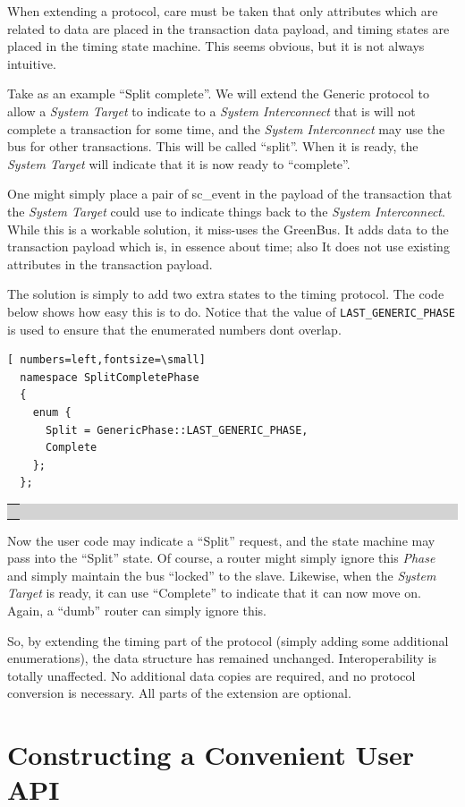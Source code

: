 \documentclass[12pt,oneside]{gsbook}
\newcommand{\slave}{{\em System Target}\xspace}
\newcommand{\router}{{\em System Interconnect}\xspace}
\newcommand{\atom}{{\em Phase}\xspace}
\def\example#1{\begin{center}\colorbox{lightgrey}{\begin{tabular}{|p{0.6\paperwidth}|}\hline\\#1\\ \\ \hline\end{tabular}}\end{center}}
\newenvironment{exampleenv}{\begin{lrbox}{\examplebox}\begin{minipage}{0.6\paperwidth}}{\end{minipage}\end{lrbox}\example{\usebox{\examplebox}}}
\begin{document}
When extending a protocol, care must be taken that only attributes
which are related to data are placed in the transaction data payload,
and timing states are placed in the timing state machine. This seems
obvious, but it is not always intuitive.

Take as an example ``Split complete''. We will extend the Generic
protocol to allow a \slave to indicate to a \router that is will not
complete a transaction for some time, and the \router may use the bus
for other transactions. This will be called ``split''. When it is
ready, the \slave will indicate that it is now ready to ``complete''.

One might simply place a pair of sc\_event in the payload of the
transaction that the \slave could use to indicate things back to the
\router. While this is a workable solution, it miss-uses the
GreenBus. It adds data to the transaction payload which is, in essence
about time; also It does not use existing attributes in the transaction payload.

The solution is simply to add two extra states to the timing
protocol. The code below shows how easy this is to do. Notice that the
value of {\tt LAST\_GENERIC\_PHASE} is used to ensure that the
enumerated numbers dont overlap.

\begin{exampleenv}
\begin{Verbatim}[ numbers=left,fontsize=\small]
  namespace SplitCompletePhase
  {
    enum {
      Split = GenericPhase::LAST_GENERIC_PHASE,
      Complete
    };
  };
\end{Verbatim}
\end{exampleenv}

Now the user code may indicate a ``Split'' request, and the state
machine may pass into the ``Split'' state. Of course, a router might
simply ignore this \atom and simply maintain the bus ``locked'' to
the slave. Likewise, when the \slave is ready, it can use ``Complete''
to indicate that it can now move on. Again, a ``dumb'' router can
simply ignore this.

So, by extending the timing part of the protocol (simply adding some
additional enumerations), the data structure has remained
unchanged. Interoperability is totally unaffected. No additional data
copies are required, and no protocol conversion is necessary. All
parts of the extension are optional.

\section{ Constructing a Convenient User API }
\end{document}

